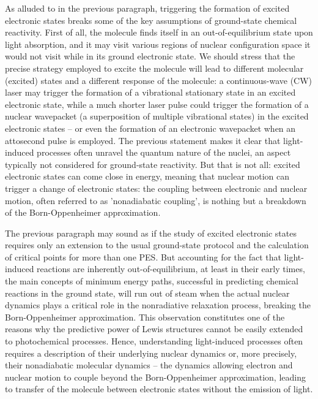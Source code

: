 \documentclass[9pt,bestpractices,pubversion]{livecoms}
\begin{document}
As alluded to in the previous paragraph, triggering the formation of excited electronic states breaks some of the key assumptions of ground-state chemical reactivity. First of all, the molecule finds itself in an out-of-equilibrium state upon light absorption, and it may visit various regions of nuclear configuration space it would not visit while in its ground electronic state. We should stress that the precise strategy employed to excite the molecule will lead to different molecular (excited) states and a different response of the molecule: a continuous-wave (CW) laser may trigger the formation of a vibrational stationary state in an excited electronic state, while a much shorter laser pulse could trigger the formation of a nuclear wavepacket (a superposition of multiple vibrational states) in the excited electronic states\cite{suchan2018importance} -- or even the formation of an electronic wavepacket when an attosecond pulse is employed. The previous statement makes it clear that light-induced processes often unravel the quantum nature of the nuclei, an aspect typically not considered for ground-state reactivity. But that is not all: excited electronic states can come close in energy, meaning that nuclear motion can trigger a change of electronic states: the coupling between electronic and nuclear motion, often referred to as 'nonadiabatic coupling', is nothing but a breakdown of the Born-Oppenheimer approximation. 

The previous paragraph may sound as if the study of excited electronic states requires only an extension to the usual ground-state protocol and the calculation of critical points for more than one PES. But accounting for the fact that light-induced reactions are inherently out-of-equilibrium, at least in their early times, the main concepts of minimum energy paths, successful in predicting chemical reactions in the ground state, will run out of steam when the actual nuclear dynamics plays a critical role in the nonradiative relaxation process, breaking the Born-Oppenheimer approximation.\cite{levine2007isomerization,liu2016dyncorrel} This observation constitutes one of the reasons why the predictive power of Lewis structures cannot be easily extended to photochemical processes. Hence, understanding light-induced processes often requires a description of their underlying nuclear dynamics or, more precisely, their nonadiabatic molecular dynamics -- the dynamics allowing electron and nuclear motion to couple beyond the Born-Oppenheimer approximation, leading to transfer of the molecule between electronic states without the emission of light.
\end{document}
